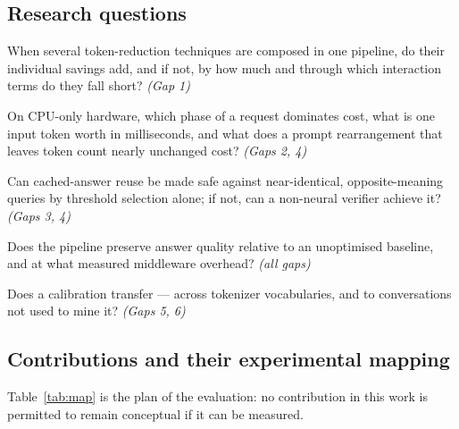 \documentclass[11pt,a4paper]{article}
\begin{document}
\subsection{Research questions}
\label{sec:rqs}

\begin{description}[leftmargin=3.1em,style=nextline,font=\bfseries]
\item[RQ1] When several token-reduction techniques are composed in one pipeline,
  do their individual savings add, and if not, by how much and through which
  interaction terms do they fall short? \hfill\emph{(Gap 1)}
\item[RQ2] On CPU-only hardware, which phase of a request dominates cost, what is
  one input token worth in milliseconds, and what does a prompt rearrangement
  that leaves token count nearly unchanged cost? \hfill\emph{(Gaps 2, 4)}
\item[RQ3] Can cached-answer reuse be made safe against near-identical,
  opposite-meaning queries by threshold selection alone; if not, can a
  non-neural verifier achieve it? \hfill\emph{(Gaps 3, 4)}
\item[RQ4] Does the pipeline preserve answer quality relative to an unoptimised
  baseline, and at what measured middleware overhead? \hfill\emph{(all gaps)}
\item[RQ5] Does a calibration transfer --- across tokenizer vocabularies, and to
  conversations not used to mine it? \hfill\emph{(Gaps 5, 6)}
\end{description}

\subsection{Contributions and their experimental mapping}
\label{sec:contrib-map}

Table~\ref{tab:map} is the plan of the evaluation: no contribution in this work
is permitted to remain conceptual if it can be measured.
\end{document}
